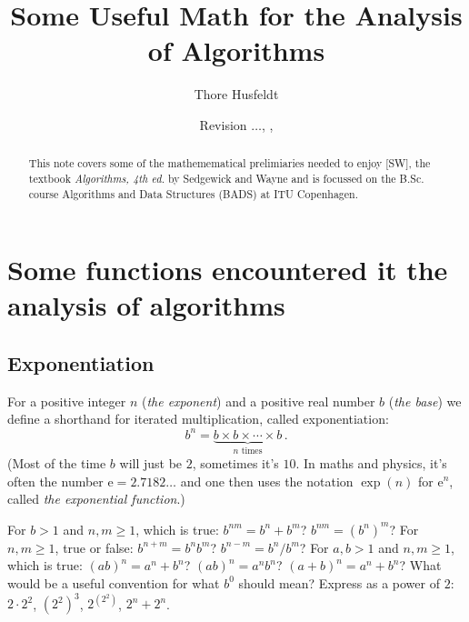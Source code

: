 \documentclass{tufte-handout}
\title{Some Useful Math for the Analysis of Algorithms}
\author{Thore Husfeldt}
\date{\small Revision {\tt \GITAbrHash}$\ldots$, \GITAuthorDate, \GITAuthorName}
\begin{document}
\maketitle
\begin{abstract}
  This note covers some of the mathemematical prelimiaries needed to
  enjoy [SW], the textbook \emph{Algorithms, 4th ed.} by Sedgewick and
  Wayne and is focussed on the B.Sc. course Algorithms and Data Structures
  (BADS) at ITU Copenhagen.
\end{abstract}

\section{Some functions encountered it the analysis of algorithms}
\label{sec-1.1}

\subsection{Exponentiation}

For a positive integer $n$ (\emph{the exponent}) and a positive real
number $b$ (\emph{the base}) we define a shorthand for iterated
multiplication, called exponentiation:
\[ b^n = \underbrace{b\times b\times \cdots\times b}_{n \text{ times}}\,.\] 
(Most of the time $b$ will just be $2$, sometimes it's $10$. In maths
and physics, it's often the number $\mathrm e=2.7182\ldots$ and one then uses
the notation $\exp(n)$ for $\mathrm e^n$, called \emph{the exponential function}.)


\begin{marginfigure}
\end{marginfigure}

\begin{ExerciseList}
\Exercise For $b>1$ and $n,m\geq 1$, which is true:
  $b^{nm}=b^n+b^m$?
  $b^{nm}= (b^n)^m$?
\Exercise For $n,m\geq 1$, true or false: 
  $b^{n+m}=b^nb^m$?
  $b^{n-m}=b^n/b^m$?
\Exercise For $a,b>1$ and $n,m\geq 1$, which is true:
  $(ab)^{n}=a^n+b^n$? 
  $(ab)^{n}=a^nb^n$?
  $(a+b)^{n}=a^n+b^n$?
\Exercise What would be a useful convention for what $b^0$ should
mean?
\Exercise Express as a power of $2$: $2\cdot 2^2$, $(2^2)^3$,
$2^{(2^2)}$, $2^n+ 2^n$.
\end{ExerciseList}
\end{document}
